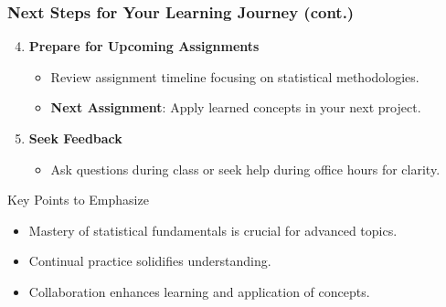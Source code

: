 \documentclass[aspectratio=169]{beamer}
\begin{document}
\begin{frame}[fragile]
    \frametitle{Next Steps for Your Learning Journey (cont.)}

    \begin{enumerate}
        \setcounter{enumi}{3} %
        \item \textbf{Prepare for Upcoming Assignments}
        \begin{itemize}
            \item Review assignment timeline focusing on statistical methodologies.
            \item \textbf{Next Assignment}: Apply learned concepts in your next project.
        \end{itemize}

        \item \textbf{Seek Feedback}
        \begin{itemize}
            \item Ask questions during class or seek help during office hours for clarity.
        \end{itemize}
    \end{enumerate}

    \begin{block}{Key Points to Emphasize}
        \begin{itemize}
            \item Mastery of statistical fundamentals is crucial for advanced topics.
            \item Continual practice solidifies understanding.
            \item Collaboration enhances learning and application of concepts.
        \end{itemize}
    \end{block}
\end{frame}
\end{document}
